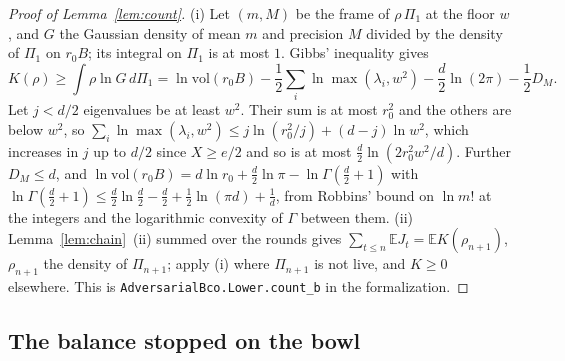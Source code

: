 \documentclass[11pt]{amsart}
\theoremstyle{definition}
\numberwithin{equation}{section}
\newcommand{\E}{\mathbb{E}}
\begin{document}
\begin{proof}[Proof of Lemma~\ref{lem:count}]
(i) Let $(m,M)$ be the frame of $\rho\,\Pi_1$ at the floor $w$, and $G$ the Gaussian density of mean $m$ and precision $M$ divided by the density of $\Pi_1$ on $r_0B$; its integral on $\Pi_1$ is at most $1$. Gibbs' inequality gives
\[
K(\rho)\ge\int\rho\ln G\,d\Pi_1=\ln\mathrm{vol}(r_0B)-\frac12\sum_i\ln\max(\lambda_i,w^2)-\frac d2\ln(2\pi)-\frac12D_M.
\]
Let $j<d/2$ eigenvalues be at least $w^2$. Their sum is at most $r_0^2$ and the others are below $w^2$, so $\sum_i\ln\max(\lambda_i,w^2)\le j\ln(r_0^2/j)+(d-j)\ln w^2$, which increases in $j$ up to $d/2$ since $X\ge e/2$ and so is at most $\frac d2\ln(2r_0^2w^2/d)$. Further $D_M\le d$, and $\ln\mathrm{vol}(r_0B)=d\ln r_0+\frac d2\ln\pi-\ln\Gamma(\frac d2+1)$ with $\ln\Gamma(\frac d2+1)\le\frac d2\ln\frac d2-\frac d2+\frac12\ln(\pi d)+\frac1d$, from Robbins' bound on $\ln m!$ at the integers and the logarithmic convexity of $\Gamma$ between them. (ii) Lemma~\ref{lem:chain}~(ii) summed over the rounds gives $\sum_{t\le n}\E J_t=\E K(\rho_{n+1})$, $\rho_{n+1}$ the density of $\Pi_{n+1}$; apply (i) where $\Pi_{n+1}$ is not live, and $K\ge0$ elsewhere.
This is \texttt{AdversarialBco.Lower.count\_b} in the formalization.
\end{proof}

\subsection*{The balance stopped on the bowl}
\end{document}
